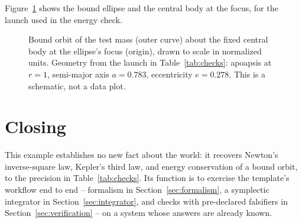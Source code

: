 \documentclass[11pt]{article}
\begin{document}
Figure~\ref{fig:orbit} shows the bound ellipse and the central body at the
focus, for the launch used in the energy check.

\begin{figure}[h]
  \centering
  \caption{Bound orbit of the test mass (outer curve) about the fixed central
  body at the ellipse's focus (origin), drawn to scale in normalized units.
  Geometry from the launch in Table~\ref{tab:checks}: apoapsis at $r = 1$,
  semi-major axis $a = 0.783$, eccentricity $e = 0.278$. This is a schematic,
  not a data plot.}
  \label{fig:orbit}
\end{figure}

\section{Closing}

This example establishes no new fact about the world: it recovers Newton's
inverse-square law, Kepler's third law, and energy conservation of a bound
orbit, to the precision in Table~\ref{tab:checks}. Its function is to exercise
the template's workflow end to end -- formalism in Section~\ref{sec:formalism},
a symplectic integrator in Section~\ref{sec:integrator}, and checks with
pre-declared falsifiers in Section~\ref{sec:verification} -- on a system whose
answers are already known.



\end{document}
